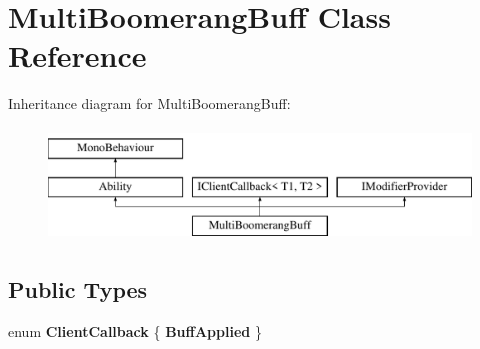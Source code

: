 \hypertarget{class_multi_boomerang_buff}{}\section{Multi\+Boomerang\+Buff Class Reference}
\label{class_multi_boomerang_buff}
Inheritance diagram for Multi\+Boomerang\+Buff\+:\begin{figure}[H]
\begin{center}
\leavevmode
\includegraphics[height=3.000000cm]{class_multi_boomerang_buff}
\end{center}
\end{figure}
\subsection*{Public Types}
\begin{DoxyCompactItemize}
\item 
\hypertarget{class_multi_boomerang_buff_a01d1d7b7254386f436b559d1a7086e0a}{}\label{class_multi_boomerang_buff_a01d1d7b7254386f436b559d1a7086e0a} 
enum {\bfseries Client\+Callback} \{ {\bfseries Buff\+Applied}
 \}
\end{DoxyCompactItemize}
